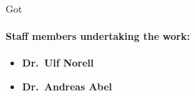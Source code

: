 \begin{sitedescription}{Got}
\paragraph{Staff members undertaking the work:}

\begin{itemize}
\item\textbf{Dr.\ Ulf Norell}

\item\textbf{Dr.\ Andreas Abel}
\end{itemize}

\end{sitedescription}

